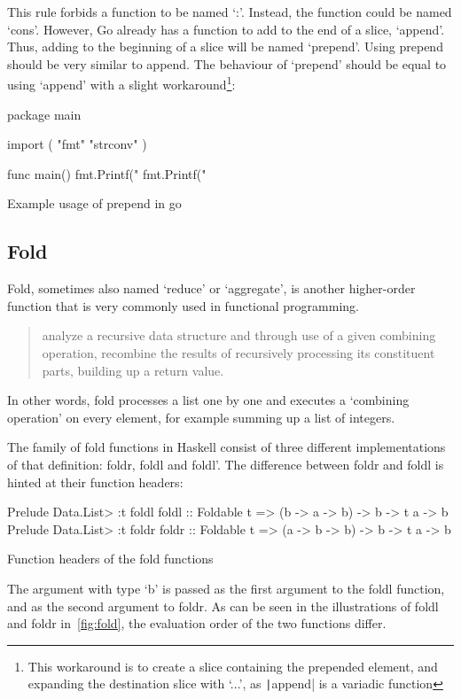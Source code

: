 This rule forbids a function to be named `:'. Instead, the function could be
named `cons'. However, Go already has a function to add to the end of a slice,
`append'. Thus, adding to the beginning of a slice will be named `prepend'.
Using prepend should be very similar to append. The behaviour of `prepend'
should be equal to using `append' with a slight workaround\footnote{This workaround
	is to create a slice containing the prepended element, and expanding the
destination slice with `...', as \texttt|append| is a variadic function}:

\begin{listing}
    \begin{gocode}
package main

import (
  "fmt"
  "strconv"
)

func main() {
	fmt.Printf("%
	fmt.Printf("%
}
\end{gocode}
    \caption{Example usage of prepend in go}\label{code:prepend-go}
\end{listing}
\subsection{Fold}\label{sec:fold}

Fold, sometimes also named `reduce' or `aggregate', is another higher-order function
that is very commonly used in functional programming.

\begin{quote}
    analyze a recursive data structure and through use of a given
    combining operation, recombine the results of recursively processing its
    constituent parts, building up a return value.\autocite{fold-wiki}
\end{quote}

In other words, fold processes a list one by one and executes a `combining operation'
on every element, for example summing up a list of integers.

The family of fold functions in Haskell consist of three different implementations of
that definition: foldr, foldl and foldl'.
The difference between foldr and foldl is hinted at their function headers:
\begin{listing}
    \begin{haskellcode}
Prelude Data.List> :t foldl
foldl :: Foldable t => (b -> a -> b) -> b -> t a -> b
Prelude Data.List> :t foldr
foldr :: Foldable t => (a -> b -> b) -> b -> t a -> b
    \end{haskellcode}
    \caption{Function headers of the fold functions}
\end{listing}
The argument with type `b' is passed as the first argument to the foldl
function, and as the second argument to foldr. As can be seen in the illustrations
of foldl and foldr in~\ref{fig:fold}, the evaluation order of the two functions
differ.

